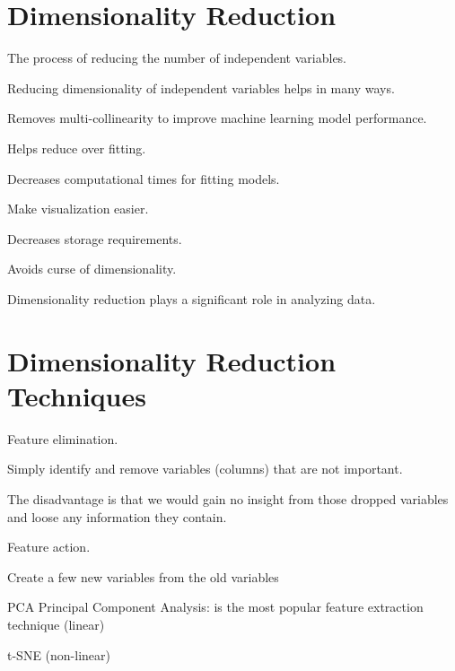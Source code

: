 	\section{Dimensionality Reduction}
	\begin{bulletedlist}
		\item The process of reducing the number of independent variables.
		\item Reducing dimensionality of independent variables helps in many ways.
		\begin{bulletedlist}
			\item Removes multi-collinearity to improve machine learning model performance.
			\item Helps reduce over fitting.
			\item Decreases computational times for fitting models.
			\item Make visualization easier.
			\item Decreases storage requirements.
			\item Avoids curse of dimensionality.
		\end{bulletedlist}
		\item Dimensionality reduction plays a significant role in analyzing data.
	\end{bulletedlist}

	\section{Dimensionality Reduction Techniques}

	\begin{bulletedlist}
		\item Feature elimination.
		\begin{bulletedlist}
			\item Simply identify and remove variables (columns) that are not important.
			\item The disadvantage is that we would gain no insight from those dropped variables and loose any information they contain.
		\end{bulletedlist}
		\item Feature action.
		\begin{bulletedlist}
			\item Create a few new variables from the old variables
			\item PCA  Principal Component Analysis: is the most popular feature extraction technique (linear)
			\item t-SNE (non-linear)
		\end{bulletedlist}
	\end{bulletedlist}

